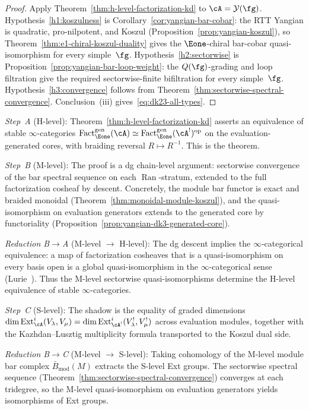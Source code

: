\begin{proof}
Apply Theorem~\ref{thm:h-level-factorization-kd} to
$\cA = \mathcal{Y}(\fg)$.
Hypothesis~\ref{h1:koszulness} is
Corollary~\ref{cor:yangian-bar-cobar}: the RTT Yangian is
quadratic, pro-nilpotent, and Koszul
(Proposition~\ref{prop:yangian-koszul}), so
Theorem~\ref{thm:e1-chiral-koszul-duality} gives the
$\Eone$-chiral bar-cobar quasi-isomorphism for every
simple~$\fg$.
Hypothesis~\ref{h2:sectorwise} is
Proposition~\ref{prop:yangian-bar-loop-weight}: the $Q(\fg)$-grading
and loop filtration give the required sectorwise-finite bifiltration
for every simple~$\fg$.
Hypothesis~\ref{h3:convergence} follows from
Theorem~\ref{thm:sectorwise-spectral-convergence}.
Conclusion~(iii) gives~\eqref{eq:dk23-all-types}.
\end{proof}

\begin{remark}
\label{rem:dk23-hms}
\emph{Step~A} (H-level):
Theorem~\ref{thm:h-level-factorization-kd} asserts an
equivalence of stable $\infty$-categories
$\operatorname{Fact}_{\Eone}^{\mathrm{gen}}(\cA)
\simeq
\operatorname{Fact}_{\Eone}^{\mathrm{gen}}(\cA^!)^{\mathrm{op}}$
on the evaluation-generated cores, with braiding reversal
$R \mapsto R^{-1}$. This is the theorem.

\emph{Step~B} (M-level):
The proof is a dg chain-level argument: sectorwise convergence
of the bar spectral sequence on each
$\operatorname{Ran}$-stratum, extended to the full factorization
cosheaf by descent. Concretely, the module bar functor is exact
and braided monoidal
(Theorem~\ref{thm:monoidal-module-koszul}), and the
quasi-isomorphism on evaluation generators extends to the
generated core by functoriality
(Proposition~\ref{prop:yangian-dk3-generated-core}).

\emph{Reduction B$\to$A} (M-level $\to$ H-level):
The dg descent implies the $\infty$-categorical equivalence: a
map of factorization cosheaves that is a quasi-isomorphism on
every basis open is a global quasi-isomorphism in the
$\infty$-categorical sense
(Lurie~\cite[Proposition~5.5.2.2]{HA}). Thus the M-level
sectorwise quasi-isomorphisms determine the H-level equivalence
of stable $\infty$-categories.

\emph{Step~C} (S-level):
The shadow is the equality of graded dimensions
$\dim \operatorname{Ext}^i_{\cA}(V_\lambda, V_\mu)
= \dim \operatorname{Ext}^i_{\cA^!}(V_\lambda^!, V_\mu^!)$
across evaluation modules, together with the Kazhdan--Lusztig
multiplicity formula transported to the Koszul dual side.

\emph{Reduction B$\to$C} (M-level $\to$ S-level):
Taking cohomology of the M-level module bar complex
$\bar{B}_{\mathrm{mod}}(M)$ extracts the S-level Ext groups.
The sectorwise spectral sequence
(Theorem~\ref{thm:sectorwise-spectral-convergence}) converges
at each tridegree, so the M-level quasi-isomorphism on
evaluation generators yields isomorphisms of Ext groups.
\end{remark}

